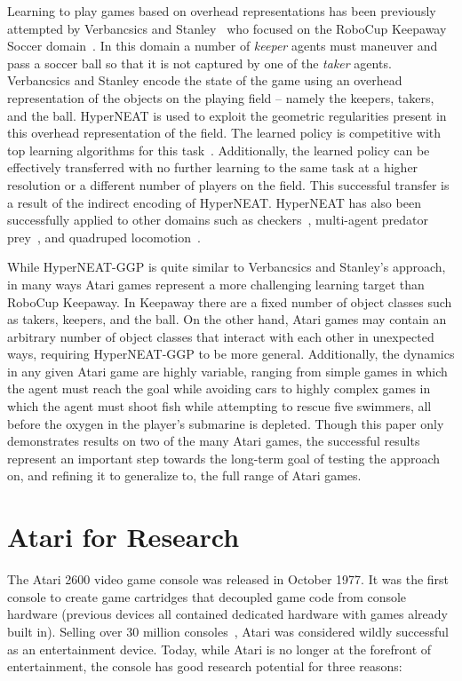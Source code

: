 \documentclass{sig-alternate}
\begin{document}
Learning to play games based on overhead representations has been previously attempted by Verbancsics and Stanley~\cite{verbancsics10} who focused on the RoboCup Keepaway Soccer domain~\cite{stone01}. In this domain a number of \textit{keeper} agents must maneuver and pass a soccer ball so that it is not captured by one of the \textit{taker} agents. Verbancsics and Stanley encode the state of the game using an overhead representation of the objects on the playing field -- namely the keepers, takers, and the ball. HyperNEAT is used to exploit the geometric regularities present in this overhead representation of the field.  The learned policy is competitive with top learning algorithms for this task~\cite{stone05}. Additionally, the learned policy can be effectively transferred with no further learning to the same task at a higher resolution or a different number of players on the field. This successful transfer is a result of the indirect encoding of HyperNEAT. HyperNEAT has also been successfully applied to other domains such as checkers~\cite{gauci08}, multi-agent predator prey~\cite{ambrosio08}, and quadruped locomotion~\cite{clune09}. 

While HyperNEAT-GGP is quite similar to Verbancsics and Stanley's approach, in many ways Atari games represent a more challenging learning target than RoboCup Keepaway. In Keepaway there are a fixed number of object classes such as takers, keepers, and the ball. On the other hand, Atari games may contain an arbitrary number of object classes that interact with each other in unexpected ways, requiring HyperNEAT-GGP to be more general. Additionally, the dynamics in any given Atari game are highly variable, ranging from simple games in which the agent must reach the goal while avoiding cars to highly complex games in which the agent must shoot fish while attempting to rescue five swimmers, all before the oxygen in the player's submarine is depleted. Though this paper only demonstrates results on two of the many Atari games, the successful results represent an important step towards the long-term goal of testing the approach on, and refining it to generalize to, the full range of Atari games.

\section{Atari for Research}
\label{sec:atari}
The Atari 2600 video game console was released in October 1977. It was the first console to create game cartridges that decoupled game code from console hardware (previous devices all contained dedicated hardware with games already built in). Selling over 30 million consoles~\cite{atarihist}, Atari was considered wildly successful as an entertainment device. Today, while Atari is no longer at the forefront of entertainment, the console has good research potential for three reasons:
\end{document}

